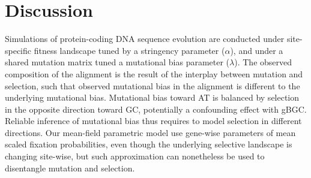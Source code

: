 \begin{table}[H]
    \centering
    \noindent{}
    \caption[Estimated parameters]{
    Nucleoprotein alignment of 498 amino-acids available for 180 species (left column).
    Lactamase alignment of 263 amino-acids available for 85 species (right column).
    }
    \label{table-mut-bias:estimation}
\end{table}


\section{Discussion}

Simulations of protein-coding DNA sequence evolution are conducted under site-specific fitness landscape tuned by a stringency parameter ($\alpha$), and under a shared mutation matrix tuned a mutational bias parameter ($\lambda$).
The observed composition of the alignment is the result of the interplay between mutation and selection, such that observed mutational bias in the alignment is different to the underlying mutational bias.
Mutational bias toward AT is balanced by selection in the opposite direction toward GC, potentially a confounding effect with gBGC.
Reliable inference of mutational bias thus requires to model selection in different directions.
Our mean-field parametric model use gene-wise parameters of mean scaled fixation probabilities, even though the underlying selective landscape is changing site-wise, but such approximation can nonetheless be used to disentangle mutation and selection.


